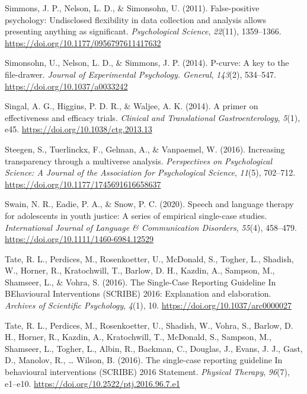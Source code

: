 \documentclass{krantz}
\newlength{\cslhangindent}
\newlength{\cslentryspacingunit} %
\newenvironment{CSLReferences}[2] %
{%
\setlength{\parindent}{0pt}
\ifodd #1
\let\oldpar\par
\def\par{\hangindent=\cslhangindent\oldpar}
\fi
\setlength{\parskip}{#2\cslentryspacingunit}
}%
{}
\begin{document}
\begin{CSLReferences}{1}{0}
\leavevmode{}%
Simmons, J. P., Nelson, L. D., \& Simonsohn, U. (2011). False-positive psychology: {Undisclosed} flexibility in data collection and analysis allows presenting anything as significant. \emph{Psychological Science}, \emph{22}(11), 1359--1366. \url{https://doi.org/10.1177/0956797611417632}

\leavevmode{}%
Simonsohn, U., Nelson, L. D., \& Simmons, J. P. (2014). P-curve: A key to the file-drawer. \emph{Journal of Experimental Psychology. General}, \emph{143}(2), 534--547. \url{https://doi.org/10.1037/a0033242}

\leavevmode{}%
Singal, A. G., Higgins, P. D. R., \& Waljee, A. K. (2014). A primer on effectiveness and efficacy trials. \emph{Clinical and Translational Gastroenterology}, \emph{5}(1), e45. \url{https://doi.org/10.1038/ctg.2013.13}

\leavevmode{}%
Steegen, S., Tuerlinckx, F., Gelman, A., \& Vanpaemel, W. (2016). Increasing transparency through a multiverse analysis. \emph{Perspectives on Psychological Science: A Journal of the Association for Psychological Science}, \emph{11}(5), 702--712. \url{https://doi.org/10.1177/1745691616658637}

\leavevmode{}%
Swain, N. R., Eadie, P. A., \& Snow, P. C. (2020). Speech and language therapy for adolescents in youth justice: {A} series of empirical single-case studies. \emph{International Journal of Language \& Communication Disorders}, \emph{55}(4), 458--479. \url{https://doi.org/10.1111/1460-6984.12529}

\leavevmode{}%
Tate, R. L., Perdices, M., Rosenkoetter, U., McDonald, S., Togher, L., Shadish, W., Horner, R., Kratochwill, T., Barlow, D. H., Kazdin, A., Sampson, M., Shamseer, L., \& Vohra, S. (2016). The {Single-Case Reporting Guideline In BEhavioural Interventions} ({SCRIBE}) 2016: {Explanation} and elaboration. \emph{Archives of Scientific Psychology}, \emph{4}(1), 10. \url{https://doi.org/10.1037/arc0000027}

\leavevmode{}%
Tate, R. L., Perdices, M., Rosenkoetter, U., Shadish, W., Vohra, S., Barlow, D. H., Horner, R., Kazdin, A., Kratochwill, T., McDonald, S., Sampson, M., Shamseer, L., Togher, L., Albin, R., Backman, C., Douglas, J., Evans, J. J., Gast, D., Manolov, R., \ldots{} Wilson, B. (2016). The single-case reporting guideline {In} behavioural interventions ({SCRIBE}) 2016 {Statement}. \emph{Physical Therapy}, \emph{96}(7), e1--e10. \url{https://doi.org/10.2522/ptj.2016.96.7.e1}


\end{CSLReferences}
\end{document}
